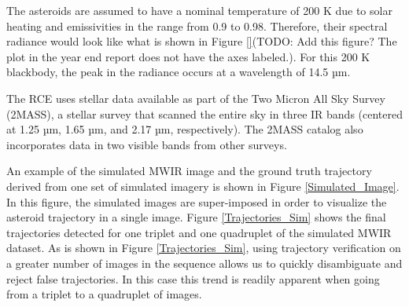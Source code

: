  The asteroids are assumed to have a nominal temperature of 200 K due to solar heating and emissivities in the range from 0.9 to 0.98. Therefore, their spectral radiance would look like what is shown in Figure \ref{}(TODO: Add this figure? The plot in the year end report does not have the axes labeled.).  For this 200 K blackbody, the peak in the radiance occurs at a wavelength of 14.5 µm.
 
 The RCE uses stellar data available as part of the Two Micron All Sky Survey (2MASS), a stellar survey that scanned the entire sky in three IR bands (centered at 1.25 µm, 1.65 µm, and 2.17 µm, respectively).  The 2MASS catalog also incorporates data in two visible bands from other surveys. 
 


An example of the simulated MWIR image and the ground truth trajectory derived from one set of simulated imagery is shown in Figure \ref{Simulated_Image}. In this figure, the simulated images are super-imposed in order to visualize the asteroid trajectory in a single image. Figure \ref{Trajectories_Sim} shows the final trajectories detected for one triplet and one quadruplet of the simulated MWIR dataset. As is shown in Figure \ref{Trajectories_Sim}, using trajectory verification on a greater number of images in the sequence allows us to quickly disambiguate and reject false trajectories. In this case this trend is readily apparent when going from a triplet to a quadruplet of images.

